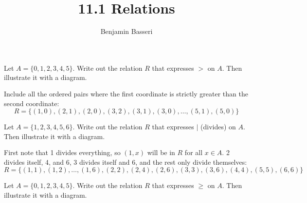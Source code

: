 \documentclass{article}
\title{11.1 Relations}
\author{Benjamin Basseri}
\begin{document}
\maketitle

\begin{problem}
Let $A = \{0, 1, 2, 3, 4, 5\}$. Write out the relation $R$ that expresses $ > $ on $A$. Then illustrate it with a diagram.
\end{problem}

Include all the ordered pairs where the first coordinate is strictly greater than the second coordinate:
$$R = \{(1, 0), (2, 1), (2, 0), (3, 2), (3, 1), (3, 0), \ldots , (5, 1), (5, 0)\}$$

\begin{problem}
Let $A = \{1, 2, 3, 4, 5, 6\}$. Write out the relation $R$ that expresses $\mid$ (divides) on $A$. Then illustrate it with a diagram.
\end{problem}

First note that 1 divides everything, so $(1, x)$ will be in $R$ for all $x \in A$. 2 divides itself, 4, and 6, 3 divides itself and 6, and the rest only divide themselves:
$$R = \{(1, 1), (1, 2), \ldots, (1, 6), (2, 2), (2, 4), (2, 6), (3, 3), (3, 6), (4, 4), (5, 5), (6, 6)\}$$

\begin{problem}
Let $A = \{0, 1, 2, 3, 4, 5\}$. Write out the relation $R$ that expresses $\geq$ on $A$. Then illustrate it with a diagram.
\end{problem}
\end{document}
